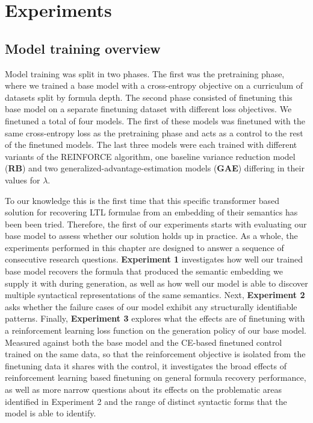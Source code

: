 \documentclass[titlepage,a4paper,11pt]{report}
\begin{document}
\chapter{Experiments}\label{chap:experiments}

    \section{Model training overview}\label{sec:model_training_overview}
    Model training was split in two phases. The first was the pretraining phase, where we trained a base model with a cross-entropy objective on a curriculum of datasets split by formula depth. The second phase consisted of finetuning this base model on a separate finetuning dataset with different loss objectives. We finetuned a total of four models. The first of these models was finetuned with the same cross-entropy loss as the pretraining phase and acts as a control to the rest of the finetuned models. The last three models were each trained with different variants of the REINFORCE algorithm, one baseline variance reduction model (\textbf{RB}) and two generalized-advantage-estimation models (\textbf{GAE}) differing in their values for $\lambda$.
    
    To our knowledge this is the first time that this specific transformer based solution for recovering LTL formulae from an embedding of their semantics has been been tried. Therefore, the first of our experiments starts with evaluating our base model to assess whether our solution holds up in practice. As a whole, the experiments performed in this chapter are designed to answer a sequence of consecutive research questions. \textbf{Experiment 1} investigates how well our trained base model recovers the formula that produced the semantic embedding we supply it with during generation, as well as how well our model is able to discover multiple syntactical representations of the same semantics. Next, \textbf{Experiment 2} asks whether the failure cases of our model exhibit any structurally identifiable patterns. Finally, \textbf{Experiment 3} explores what the effects are of finetuning with a reinforcement learning loss function on the generation policy of our base model. Measured against both the base model and the CE-based finetuned control trained on the same data, so that the reinforcement objective is isolated from the finetuning data it shares with the control, it investigates the broad effects of reinforcement learning based finetuning on general formula recovery performance, as well as more narrow questions about its effects on the problematic areas identified in Experiment 2 and the range of distinct syntactic forms that the model is able to identify. 
    
\end{document}
